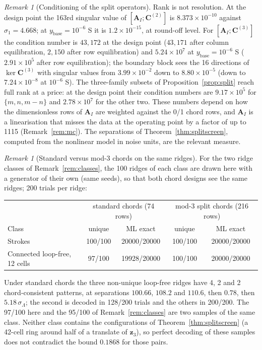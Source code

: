 \documentclass[11pt,a4paper]{article}
\theoremstyle{definition}
\theoremstyle{remark}
\newtheorem{remark}[theorem]{Remark}
\begin{document}
\begin{remark}[Conditioning of the split operators]\label{rem:splitcond}
Rank is not resolution. At the design point the 163rd singular value of $[\mathbf{A}_I;\mathbf{C}^{(2)}]$ is $8.373\times10^{-10}$ against $\sigma_1 = 4.668$; at $y_{\text{base}} = 10^{-6}$ S it is $1.2\times10^{-15}$, at round-off level. For $[\mathbf{A}_I;\mathbf{C}^{(3)}]$ the condition number is $43{,}172$ at the design point ($43{,}171$ after column equilibration, $2{,}150$ after row equilibration) and $5.24\times10^{7}$ at $y_{\text{base}} = 10^{-6}$ S ($2.91\times10^{5}$ after row equilibration); the boundary block sees the 16 directions of $\ker\mathbf{C}^{(3)}$ with singular values from $3.99\times10^{-2}$ down to $8.80\times10^{-5}$ (down to $7.24\times10^{-8}$ at $10^{-6}$ S). The three-family subsets of Proposition~\ref{prop:split} reach full rank at a price: at the design point their condition numbers are $9.17\times10^{5}$ for $\{m,n,m-n\}$ and $2.78\times10^{7}$ for the other two. These numbers depend on how the dimensionless rows of $\mathbf{A}_I$ are weighted against the 0/1 chord rows, and $\mathbf{A}_I$ is a linearisation that misses the data at the operating point by a factor of up to 1115 (Remark~\ref{rem:mc}). The separations of Theorem~\ref{thm:splitscreen}, computed from the nonlinear model in noise units, are the relevant measure.
\end{remark}

\begin{remark}[Standard versus mod-3 chords on the same ridges]\label{rem:splitstudy}
For the two ridge classes of Remark~\ref{rem:classes}, the 100 ridges of each class are drawn here with a generator of their own (same seeds), so that both chord designs see the same ridges; 200 trials per ridge:
\begin{center}\small
\begin{tabular}{@{}lcccc@{}}
\toprule
& \multicolumn{2}{c}{standard chords (74 rows)} & \multicolumn{2}{c}{mod-3 split chords (216 rows)} \\
Class & unique & ML exact & unique & ML exact \\
\midrule
Strokes & 100/100 & 20000/20000 & 100/100 & 20000/20000 \\
Connected loop-free, 12 cells & 97/100 & 19928/20000 & 100/100 & 20000/20000 \\
\bottomrule
\end{tabular}
\end{center}
Under standard chords the three non-unique loop-free ridges have 4, 2 and 2 chord-consistent patterns, at separations $100.66$, $108.2$ and $110.6$, then $0.78$, then $5.18\,\sigma_\Lambda$; the second is decoded in 128/200 trials and the others in 200/200. The 97/100 here and the 95/100 of Remark~\ref{rem:classes} are two samples of the same class. Neither class contains the configurations of Theorem~\ref{thm:splitscreen} (a 42-cell ring around half of a translate of $\mathbf{z}_3$), so perfect decoding of these samples does not contradict the bound $0.1868$ for those pairs.
\end{remark}
\end{document}
